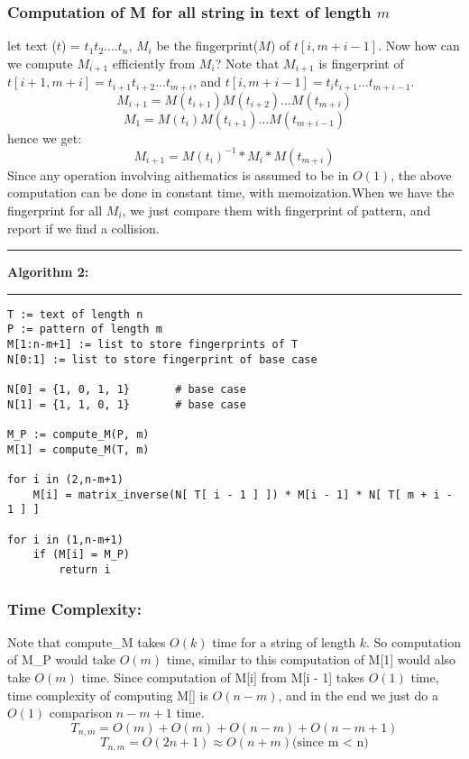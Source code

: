 \documentclass[a4paper]{article}
\begin{document}
\subsubsection*{Computation of M for all string in text of length \boldmath$ m $}
let text ($t$) = $t_1t_2\ldots.t_n$, $M_{i}$ be the fingerprint($M$) of $t[i,m + i - 1]$. Now how can we compute $M_{i+1}$ efficiently from $M_i$? Note that $M_{i+1}$ is fingerprint of $t[i+1,m+i] = t_{i+1} t_{i+2}\ldots t_{m+i}$, and $t[i,m +i-1] = t_i t_{i+1}\ldots t_{m+i-1}$.
$$M_{i+1} = M(t_{i+1})M(t_{i+2})\ldots M(t_{m+i})$$
$$M_1 = M(t_{i})M(t_{i+1})\ldots M(t_{m+i-1})$$
hence we get:
$$M_{i+1} = M(t_i)^{-1} * M_i * M(t_{m+i}) $$
Since any operation involving aithematics is assumed to be in $O(1)$, the above computation can be done in constant time, with memoization.When we have the fingerprint for all $M_i$, we just compare them with fingerprint of pattern, and report if we find a collision.

\pagebreak

\noindent\rule{\textwidth}{0.4pt}
\textbf{Algorithm 2:} \\
\noindent\rule{\textwidth}{0.2pt}
\begin{lstlisting}[columns=fullflexible] 
T := text of length n
P := pattern of length m
M[1:n-m+1] := list to store fingerprints of T
N[0:1] := list to store fingerprint of base case

N[0] = {1, 0, 1, 1}       # base case
N[1] = {1, 1, 0, 1}       # base case

M_P := compute_M(P, m)
M[1] = compute_M(T, m)

for i in (2,n-m+1)
    M[i] = matrix_inverse(N[ T[ i - 1 ] ]) * M[i - 1] * N[ T[ m + i - 1 ] ]

for i in (1,n-m+1)
    if (M[i] = M_P)
        return i
\end{lstlisting}
\vspace{1.5em}
\subsubsection*{Time Complexity:}
Note that compute\_M takes $O(k)$ time for a string of length $k$. So computation of M\_P would take $O(m)$ time, similar to this computation of M[1] would also take $O(m)$ time. Since computation of M[i] from M[i - 1] takes $O(1)$ time, time complexity of computing M[] is $O(n-m)$, and in the end we just do a $O(1)$ comparison $n-m+1$ time.
$$T_{n,m} = O(m) + O(m) + O(n-m) + O(n-m + 1)$$
$$T_{n,m} = O(2n + 1) \approx O(n + m) \text{(since m < n)}$$
\end{document}
